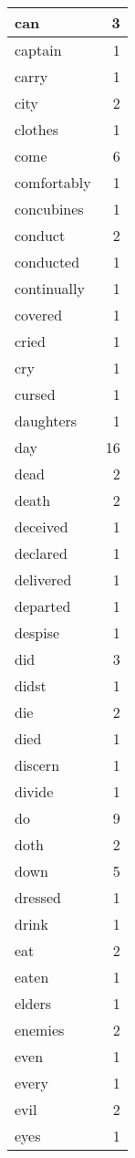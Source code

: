 \begin{center}
\begin{longtable}{l|r}
can & 3 \\ \hline
captain & 1 \\ \hline
carry & 1 \\ \hline
city & 2 \\ \hline
clothes & 1 \\ \hline
come & 6 \\ \hline
comfortably & 1 \\ \hline
concubines & 1 \\ \hline
conduct & 2 \\ \hline
conducted & 1 \\ \hline
continually & 1 \\ \hline
covered & 1 \\ \hline
cried & 1 \\ \hline
cry & 1 \\ \hline
cursed & 1 \\ \hline
daughters & 1 \\ \hline
day & 16 \\ \hline
dead & 2 \\ \hline
death & 2 \\ \hline
deceived & 1 \\ \hline
declared & 1 \\ \hline
delivered & 1 \\ \hline
departed & 1 \\ \hline
despise & 1 \\ \hline
did & 3 \\ \hline
didst & 1 \\ \hline
die & 2 \\ \hline
died & 1 \\ \hline
discern & 1 \\ \hline
divide & 1 \\ \hline
do & 9 \\ \hline
doth & 2 \\ \hline
down & 5 \\ \hline
dressed & 1 \\ \hline
drink & 1 \\ \hline
eat & 2 \\ \hline
eaten & 1 \\ \hline
elders & 1 \\ \hline
enemies & 2 \\ \hline
even & 1 \\ \hline
every & 1 \\ \hline
evil & 2 \\ \hline
eyes & 1 \\ \hline

\end{longtable}
\end{center}
